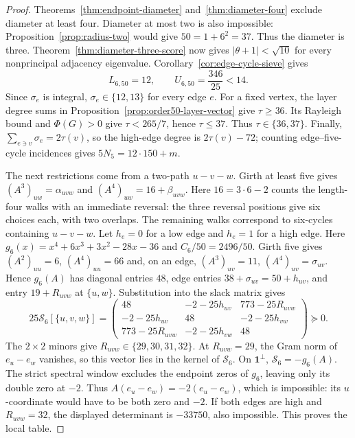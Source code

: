\documentclass[a4paper,10pt,reqno]{amsart}
\theoremstyle{plain}
\theoremstyle{definition}
\theoremstyle{remark}
\newcommand{\one}{\mathbf 1}
\begin{document}
\begin{proof}
Theorems~\ref{thm:endpoint-diameter} and~\ref{thm:diameter-four} exclude
diameter at least four. Diameter at most two is also impossible:
Proposition~\ref{prop:radius-two} would give \(50=1+6^2=37\).
Thus the diameter is three. Theorem~\ref{thm:diameter-three-score} now gives
\(|\theta+1|<\sqrt{10}\) for every nonprincipal adjacency eigenvalue.
Corollary~\ref{cor:edge-cycle-sieve} gives
\[
 L_{6,50}=12,\qquad U_{6,50}=\frac{346}{25}<14.
\]
Since \(\sigma_e\) is integral, \(\sigma_e\in\{12,13\}\) for every edge
\(e\).  For a fixed vertex, the layer degree sums in
Proposition~\ref{prop:order50-layer-vector} give $\tau\ge36$.
Its Rayleigh bound and $\Phi(G)>0$ give $\tau<265/7$, hence
$\tau\le37$. Thus $\tau\in\{36,37\}$. Finally,
\(\sum_{e\ni v}\sigma_e=2\tau(v)\), so the high-edge degree is
\(2\tau(v)-72\); counting edge--five-cycle incidences gives
\(5N_5=12\cdot150+m\).

The next restrictions come from a two-path \(u-v-w\). Girth at least
five gives \((A^3)_{uw}=\alpha_{uvw}\) and
\((A^4)_{uw}=16+\beta_{uvw}\). Here \(16=3\cdot6-2\) counts the
length-four walks with an immediate reversal: the three reversal
positions give six choices each, with two overlaps. The remaining walks
correspond to six-cycles containing \(u-v-w\).
Let \(h_e=0\) for a low edge and
\(h_e=1\) for a high edge.
Here \(g_6(x)=x^4+6x^3+3x^2-28x-36\) and \(C_6/50=2496/50\). Girth five gives
\((A^2)_{uu}=6\), \((A^4)_{uu}=66\) and, on an edge, \((A^3)_{uv}=11\),
\((A^4)_{uv}=\sigma_{uv}\). Hence \(g_6(A)\) has diagonal entries \(48\), edge
entries \(38+\sigma_{uv}=50+h_{uv}\), and entry \(19+R_{uvw}\) at \(\{u,w\}\).
Substitution into the slack matrix gives
\[
 25\mathcal S_6[\{u,v,w\}]=
 \begin{pmatrix}
 48&-2-25h_{uv}&773-25R_{uvw}\\
 -2-25h_{uv}&48&-2-25h_{vw}\\
 773-25R_{uvw}&-2-25h_{vw}&48
 \end{pmatrix}\succeq0.
\]
The \(2\times2\) minors give \(R_{uvw}\in\{29,30,31,32\}\).
At \(R_{uvw}=29\), the Gram norm of \(e_u-e_w\) vanishes, so this
vector lies in the kernel of \(\mathcal S_6\). On \(\one^\perp\),
\(\mathcal S_6=-g_6(A)\). The strict spectral window excludes the
endpoint zeros of \(g_6\), leaving only its double zero at \(-2\).
Thus \(A(e_u-e_w)=-2(e_u-e_w)\), which is impossible: its
\(u\)-coordinate would have to be both zero and \(-2\).
If both edges are high and \(R_{uvw}=32\), the displayed determinant
is \(-33750\), also impossible. This proves the local table.


\end{proof}
\end{document}
